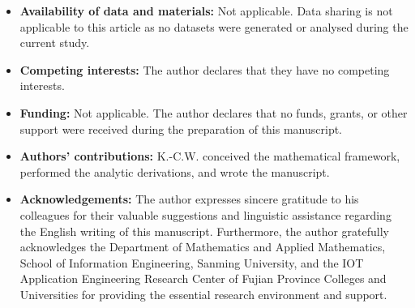 \documentclass[pdflatex,sn-basic,Numbered]{sn-jnl}
\theoremstyle{thmstyleone}%
\theoremstyle{thmstylethree}%
\begin{document}
\begin{itemize}
	\item \textbf{Availability of data and materials:} Not applicable. Data sharing is not applicable to this article as no datasets were generated or analysed during the current study.
	\item \textbf{Competing interests:} The author declares that they have no competing interests.
	\item \textbf{Funding:} Not applicable. The author declares that no funds, grants, or other support were received during the preparation of this manuscript.
	\item \textbf{Authors' contributions:} K.-C.W. conceived the mathematical framework, performed the analytic derivations, and wrote the manuscript.
	\item \textbf{Acknowledgements:} The author expresses sincere gratitude to his colleagues for their valuable suggestions and linguistic assistance regarding the English writing of this manuscript. Furthermore, the author gratefully acknowledges the Department of Mathematics and Applied Mathematics, School of Information Engineering, Sanming University, and the IOT Application Engineering Research Center of Fujian Province Colleges and Universities for providing the essential research environment and support.
\end{itemize}



\end{document}
